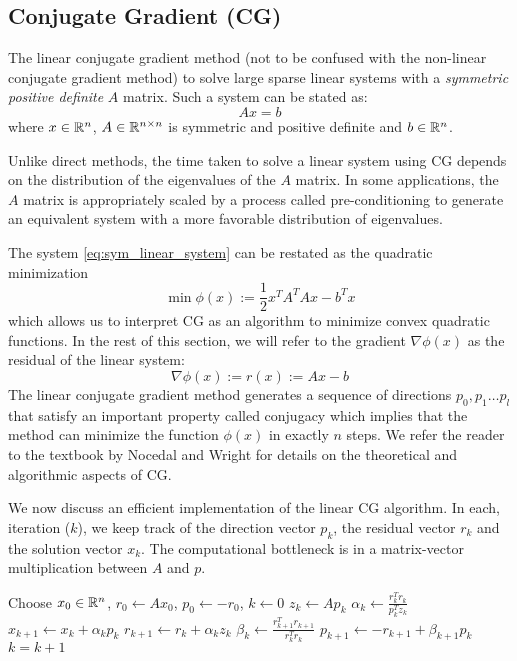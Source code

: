 \subsection{Conjugate Gradient (CG)}
The linear conjugate gradient method (not to be confused with the non-linear
conjugate gradient method) to solve large sparse linear systems with a
\textit{symmetric positive definite} $A$ matrix. Such a system can be stated as:
\begin{equation}
  \label{eq:sym_linear_system}
  Ax = b
\end{equation}
where $x \in \mathbb{R}^{n}$, $A \in \mathbb{R}^{n \times n}$ is symmetric and positive
definite and $b \in \mathbb{R}^{n}$.

Unlike direct methods, the time taken to solve a linear system using CG depends on the
distribution of the eigenvalues of the $A$ matrix. In some applications,
the $A$ matrix is appropriately scaled by a process called pre-conditioning to
generate an equivalent system with a more favorable distribution of eigenvalues.


The system \eqref{eq:sym_linear_system} can be restated as the quadratic minimization
$$
  \min \phi(x) := \frac{1}{2} x^T A^T A x - b^T x
$$
which allows us to interpret CG as an algorithm to minimize convex quadratic
functions. In the rest of this section, we will refer to the gradient $\nabla \phi(x)$
as the residual of the linear system:
$$
  \nabla \phi(x) := r(x) := Ax - b
$$
The linear conjugate gradient method generates a sequence of directions ${p_0, p_1 \ldots p_l}$
that satisfy an important property called conjugacy which implies that the method
can minimize the function $\phi(x)$ in exactly $n$ steps. We refer the reader
to the textbook by Nocedal and Wright \cite{nocedal2006numerical} for details on the
theoretical and algorithmic aspects of CG.

We now discuss an efficient implementation of the linear CG algorithm. In each,
iteration ($k$), we keep track of the direction vector $p_k$, the residual
vector $r_k$ and the solution vector $x_k$. The computational bottleneck
is in a matrix-vector multiplication between $A$ and $p$.

\begin{algorithm}%
\begin{algorithmic}[1]
  \State Choose $x_0 \in \mathbb{R}^n$, $r_0 \leftarrow Ax_0$, $p_0 \leftarrow -r_0$, $k \leftarrow 0$
    \State$z_k \leftarrow Ap_k$
    \State$\alpha_k \leftarrow \frac{r_k^T r_k}{p_k^T z_k}$
    \State$x_{k+1} \leftarrow x_k + \alpha_k p_k$
    \State$r_{k+1} \leftarrow r_k + \alpha_k z_k$
    \State$\beta_k \leftarrow \frac{r_{k+1}^T r_{k+1}}{r_k^T r_k}$
    \State$p_{k+1} \leftarrow -r_{k+1} + \beta_{k+1} p_k$
    \State$k = k + 1$
  \EndWhile
\end{algorithmic}
\label{alg:cg}
\end{algorithm}

